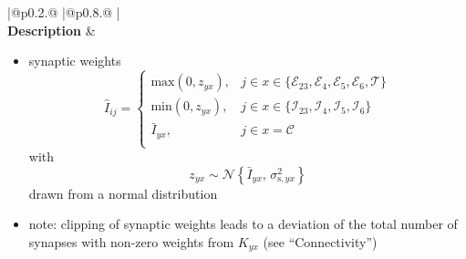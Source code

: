 \documentclass[10pt,a4paper,twoside,american]{article}
\theoremstyle{definitionstyle}
\begin{document}
\clearpage
\begin{table}
\begin{tabular}{
  |@{\hspace*{\marg}}p{}@{\hspace*{\marg}}
  |@{\hspace*{\marg}}p{}@{\hspace*{\marg}}
  |}
  \hline 
  \\
  \hline 
  \textbf{Description} &
  \begin{itemize}
  \item synaptic weights
  \begin{equation*}
	  \hat{I}_{ij} = \begin{cases} 
      \text{max}(0,z_{yx}), & j \in x\in\{\mathcal{E}_{23},\mathcal{E}_{4},\mathcal{E}_{5},\mathcal{E}_{6},\mathcal{T}\} \\
      \text{min}(0,z_{yx}), & j \in x\in\{\mathcal{I}_{23},\mathcal{I}_{4},\mathcal{I}_{5},\mathcal{I}_{6}\} \\
      \bar{I}_{yx}, & j \in x=\mathcal{C} \\
      \end{cases}
  \end{equation*}
  with
  \begin{equation*}
      z_{yx} \sim\mathcal{N}\left\{\bar{I}_{yx},\,\sigma_{\text{s},yx}^2\right\}
  \end{equation*}
  drawn from a normal distribution
  \item[] note: clipping of synaptic weights leads to a deviation of the total number of synapses with non-zero weights from $K_{yx}$ (see ``Connectivity'')


\end{itemize}
\end{tabular}
\end{table}
\end{document}
